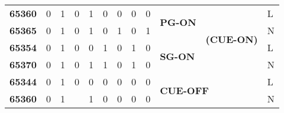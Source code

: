 {\begin{table}[]
\begin{tabular}{|l|l|l|l|l|l|l|l|l|l|c|l|}
\textbf{65360}                                                  & 0             & 1                               & 0               & 1           & 0                                & 0                                & 0                                & 0                                & \multirow{2}{*}{\textbf{PG-ON}}                      & \multirow{4}{*}{\textbf{(CUE-ON)}} & L      \\ \cline{1-9} \cline{12-12} 
\textbf{65365}                                                  & 0             & 1                               & 0               & 1           & 0                                & 1                                & 0                                & 1                                &                                                      &                                    & N      \\ \cline{1-10} \cline{12-12} 
\textbf{65354}                                                  & 0             & 1                               & 0               & 0           & 1                                & 0                                & 1                                & 0                                & \multirow{2}{*}{\textbf{SG-ON}}                      &                                    & L      \\ \cline{1-9} \cline{12-12} 
\textbf{65370}                                                  & 0             & 1                               & 0               & 1           & 1                                & 0                                & 1                                & 0                                &                                                      &                                    & N      \\ \hline
\textbf{65344}                                                  & 0             & 1                               & 0               & 0           & 0                                & 0                                & 0                                & 0                                & \multicolumn{2}{l|}{\multirow{2}{*}{\textbf{CUE-OFF}}}                                    & L      \\ \cline{1-9} \cline{12-12} 
\textbf{65360}                                                  & 0             & 1                               &                 & 1           & 0                                & 0                                & 0                                & 0                                & \multicolumn{2}{l|}{}                                                                     & N      \\ \hline

\end{tabular}
\end{table}}
